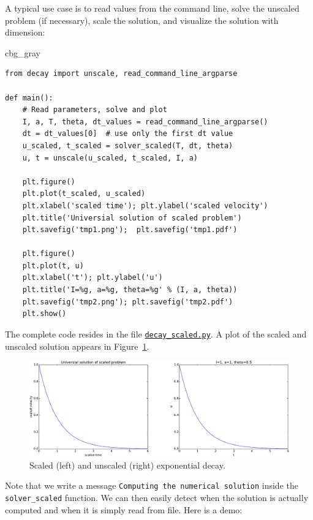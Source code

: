 \documentclass[graybox,envcountchap,sectrefs,final]{svmonodo}
\newenvironment{_cod_tight}[1]{
   \def\FrameCommand{\colorbox{#1}}
   \FrameRule0.6pt\MakeFramed {\FrameRestore}\vskip3mm}
   {\vskip0mm\endMakeFramed}
\newenvironment{cod}[1]{
\bgroup\rmfamily
\fboxsep=0mm\relax
\begin{_cod_tight}{#1}
\list{}{\parsep=-2mm\parskip=0mm\topsep=0pt\leftmargin=2mm
\rightmargin=2\leftmargin\leftmargin=4pt\relax}
\item\relax}
{\endlist\end{_cod_tight}\egroup}
\begin{document}
A typical use case is to read values from the command line,
solve the unscaled problem (if necessary), scale the solution, and visualize
the solution with dimension:

\begin{cod}{cbg_gray}\begin{Verbatim}[numbers=none,fontsize=\fontsize{9pt}{9pt},baselinestretch=0.95,xleftmargin=2mm]
from decay import unscale, read_command_line_argparse

def main():
    # Read parameters, solve and plot
    I, a, T, theta, dt_values = read_command_line_argparse()
    dt = dt_values[0]  # use only the first dt value
    u_scaled, t_scaled = solver_scaled(T, dt, theta)
    u, t = unscale(u_scaled, t_scaled, I, a)

    plt.figure()
    plt.plot(t_scaled, u_scaled)
    plt.xlabel('scaled time'); plt.ylabel('scaled velocity')
    plt.title('Universial solution of scaled problem')
    plt.savefig('tmp1.png');  plt.savefig('tmp1.pdf')

    plt.figure()
    plt.plot(t, u)
    plt.xlabel('t'); plt.ylabel('u')
    plt.title('I=%g, a=%g, theta=%g' % (I, a, theta))
    plt.savefig('tmp2.png'); plt.savefig('tmp2.pdf')
    plt.show()
\end{Verbatim}
\end{cod}
\noindent
The complete code resides in the file
\href{{http://tinyurl.com/o8pb3yy/decay_scaled.py}}{\nolinkurl{decay_scaled.py}}.
A plot of the scaled and unscaled solution appears in Figure~\ref{sec:decay:fig:simplest}.


\begin{figure}[!ht]  %
  \centerline{\includegraphics[width=1.0\linewidth]{fig-scaling/decay.pdf}}
  \caption{
  Scaled (left) and unscaled (right) exponential decay. \label{sec:decay:fig:simplest}
  }
\end{figure}



Note that we write a message \texttt{Computing the numerical solution} inside
the \Verb!solver_scaled! function. We can then easily detect when
the solution is actually computed and when it is simply read from file.
Here is a demo:
\end{document}
